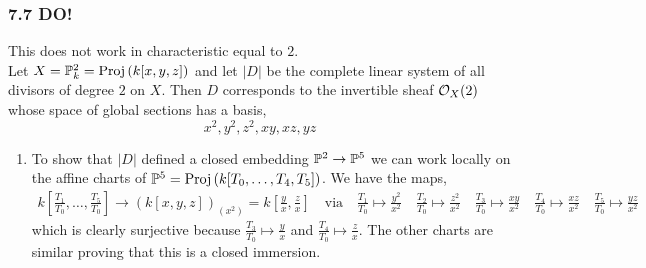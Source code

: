 \documentclass[12pt]{article}
\begin{document}
\subsubsection{7.7 DO!}
This does not work in characteristic equal to $2$.
\bigskip\\
Let $X = \P^2_k = \Proj{k[x,y,z]}$ and let $|D|$ be the complete linear system of all divisors of degree $2$ on $X$. Then $D$ corresponds to the invertible sheaf $\struct{X}(2)$ whose space of global sections has a basis,
\[ x^2, y^2, z^2, xy, xz, yz \]

\begin{enumerate}
\item To show that $|D|$ defined a closed embedding $\P^2 \to \P^5$ we can work locally on the affine charts of $\P^5 = \Proj{k[T_0, \dots, T_4, T_5]}$. We have the maps,
\begin{align*}
k[\tfrac{T_1}{T_0}, \dots, \tfrac{T_5}{T_0}] \to (k[x,y,z])_{(x^2)} = k[\tfrac{y}{x}, \tfrac{z}{x}] \quad \text{via} \quad \tfrac{T_1}{T_0} \mapsto \tfrac{y^2}{x^2} \quad \tfrac{T_2}{T_0} \mapsto \tfrac{z^2}{x^2} \quad \tfrac{T_3}{T_0} \mapsto \tfrac{xy}{x^2} \quad \tfrac{T_4}{T_0} \mapsto \tfrac{xz}{x^2} \quad \tfrac{T_5}{T_0} \mapsto \tfrac{yz}{x^2}
\end{align*}
which is clearly surjective because $\tfrac{T_3}{T_0} \mapsto \tfrac{y}{x}$ and $\tfrac{T_4}{T_0} \mapsto \tfrac{z}{x}$. The other charts are similar proving that this is a closed immersion.


\end{enumerate}
\end{document}
